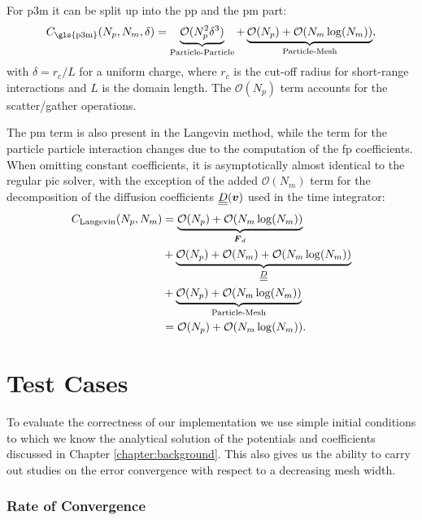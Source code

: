 For \gls{p3m} it can be split up into the \gls{pp} and the \gls{pm} part:
\begin{equation}
    C_{\text{\gls{p3m}}}(N_p, N_m, \delta) = \underbrace{\mathcal O( N_p^2 \delta^3)}_{\text{Particle-Particle}}
    + \underbrace{\mathcal O(N_p) 
    + \mathcal O(N_m \log(N_m))}_{\text{Particle-Mesh}},
\end{equation}
with $\delta = r_c / L$ for a uniform charge, where $r_c$ is the cut-off radius for short-range
interactions and $L$ is the domain length.
The $\mathcal O(N_p)$ term accounts for the scatter/gather operations.

The \gls{pm} term is also present in the Langevin method, while the term for the particle
particle interaction changes due to the computation of the \gls{fp} coefficients.
When omitting constant coefficients, it is asymptotically almost identical to the 
regular \gls{pic} solver, with the exception of the added $\mathcal O(N_m)$ term for the decomposition of the diffusion
coefficients $\underline{\underline{D}}(\boldsymbol{v})$ used in the time integrator:
\begin{align}
    \nonumber
    C_{\text{Langevin}}(N_p, N_m) &= \underbrace{\mathcal O(N_p) + \mathcal O(N_m \log(N_m))}_{\text{$\boldsymbol{F}_d$}} \\ \nonumber
                                          &+ \underbrace{\mathcal O(N_p) + \mathcal O(N_m) +
                                          \mathcal O(N_m \log(N_m))}_{\text{$\underline{\underline{D}}$}} \\ \nonumber
                                          &+ \underbrace{\mathcal O(N_p) + \mathcal O(N_m \log(N_m))}_{\text{Particle-Mesh}} \\
    &= \mathcal O(N_p) + \mathcal O(N_m \log(N_m)). 
\end{align}

\section{Test Cases}
\label{section:test_cases}

To evaluate the correctness of our implementation we use simple initial conditions to which we know
the analytical solution of the potentials and coefficients discussed in Chapter \ref{chapter:background}.
This also gives us the ability to carry out studies on the error convergence with respect to a decreasing mesh width.

\subsubsection{Rate of Convergence}

